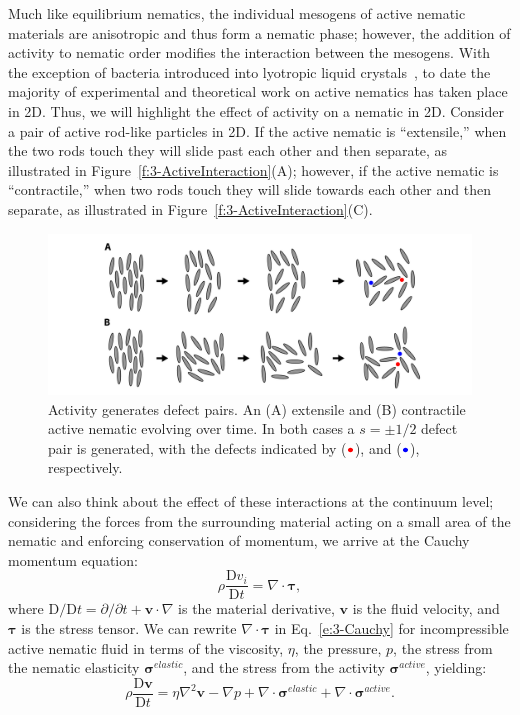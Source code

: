 Much like equilibrium nematics, the individual mesogens of active nematic materials are anisotropic and thus form a nematic phase; however, the addition of activity to nematic order modifies the interaction between the mesogens.
With the exception of bacteria introduced into lyotropic liquid crystals~\cite{RN86}, to date the majority of experimental and theoretical work on active nematics has taken place in 2D.
Thus, we will highlight the effect of activity on a nematic in 2D.
Consider a pair of active rod-like particles in 2D.
If the active nematic is ``extensile,'' when the two rods touch they will slide past each other and then separate, as illustrated in Figure~\ref{f:3-ActiveInteraction}(A); however, if the active nematic is ``contractile,'' when two rods touch they will slide towards each other and then separate, as illustrated in Figure~\ref{f:3-ActiveInteraction}(C).
\begin{figure}
  \centering
  \includegraphics{figures/C3/Ch3-Figs_ActiveDefectGen.png}
  \caption{Activity generates defect pairs.
  An (A) extensile and (B) contractile active nematic evolving over time.
  In both cases a $s = \pm 1/2$ defect pair is generated, with the defects indicated by (${\color{red} \bullet}$), and (${\color{blue} \bullet}$), respectively.}\label{f:3-ActiveDefectGen}
\end{figure}

We can also think about the effect of these interactions at the continuum level; considering the forces from the surrounding material acting on a small area of the nematic and enforcing conservation of momentum, we arrive at the Cauchy momentum equation:
\begin{equation}
  \rho \frac{\textrm{D} v_i}{\textrm{D}t } = \nabla \cdot \bm{\tau},\label{e:3-Cauchy}
\end{equation}
where $\textrm{D}/\textrm{D}t = \partial/\partial t + \mathbf{v} \cdot \nabla$ is the material derivative, $\mathbf{v}$ is the fluid velocity, and $\bm{\tau}$ is the stress tensor.
We can rewrite $\nabla \cdot \bm{\tau}$ in Eq.~\ref{e:3-Cauchy} for incompressible active nematic fluid in terms of the viscosity, $\eta$, the pressure, $p$, the stress from the nematic elasticity $\bm{\sigma}^{elastic}$, and the stress from the activity $\bm{\sigma}^{active}$, yielding:
\begin{equation}
  \rho \frac{\textrm{D} \mathbf{v}}{\textrm{D}t } = \eta \nabla^2 \mathbf{v} - \nabla p + \nabla \cdot \bm{\sigma}^{elastic} + \nabla \cdot \bm{\sigma}^{active}.\label{e:3-NavierStokes}
\end{equation}

